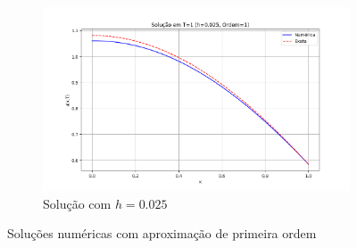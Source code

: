 \documentclass[column,amsmath,amssymb,floatfix]{revtex4}
\begin{document}
\begin{figure}[H]
	\begin{subfigure}{0.35\textwidth}
		\includegraphics[width=\textwidth]{img/ex0103.png}
		\caption{Solução com $h=0.025$}
		\label{fig:ex1_3}
	\end{subfigure}
	\caption{Soluções numéricas com aproximação de primeira ordem}
	\label{fig:ex1_ord1}
\end{figure}
\end{document}
